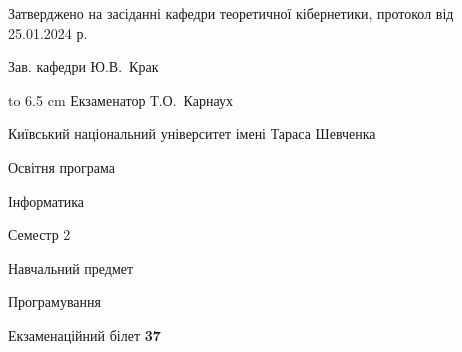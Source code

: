 \documentclass[12pt, ukrainian]{article}
\begin{document}
{\smallskip\smallskip \begin {scriptsize} Затверджено на засіданні кафедри теоретичної кібернетики, протокол   від   25.01.2024 р.\par\smallskip\smallskip\smallskip\smallskip
{\parbox {6.5 cm} {Зав. кафедри \dotfill Ю.В.~Крак}}\hspace {0.7cm} {\hbox to 6.5 cm { Екзаменатор \dotfill Т.О.~Карнаух}} \end{scriptsize}}
\newpage
{{\begin {scriptsize}\par
{ \center  Київський національний університет імені Тараса Шевченка \par}
{\parbox {5 cm}{Освітня програма \hfill}{\parbox {7 cm}{Інформатика\hfill}}\parbox {6 cm}{\hfill Семестр 2}}\par
{\parbox {5 cm} {Навчальний предмет \hfill}\parbox {7 cm}{Програмування \hfill}\parbox {6cm}{\hfill}\par}\vspace{-15pt} \end{scriptsize}}{\center Екзаменаційний білет \No \textbf { 37 }\par}}
\end{document}
